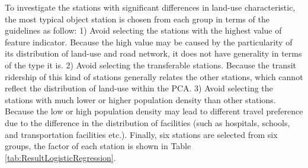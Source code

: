 \documentclass[utf8]{article}
\begin{document}
%
To investigate the stations with significant differences in land-use characteristic, the most typical object station is chosen from each group in terms of the guidelines as follow: 1) Avoid selecting the stations with the highest value of feature indicator. Because the high value may be caused by the particularity of its distribution of land-use and road network, it does not have generality in terms of the type it is. 2) Avoid selecting the transferable stations. Because the transit ridership of this kind of stations generally relates the other stations, which cannot reflect the distribution of land-use within the PCA. 3) Avoid selecting the stations with much lower or higher population density than other stations. Because the low or high population density may lead to different travel preference due to the difference in the distribution of facilities (such as hospitals, schools, and transportation facilities etc.). Finally, six stations are selected from six groups, the factor of each station is shown in Table \ref{tab:ResultLogisticRegression}.
\end{document}
